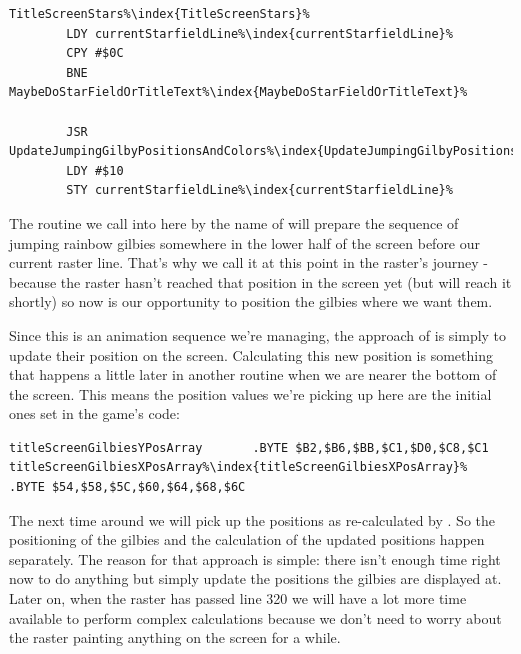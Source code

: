 \begin{lstlisting}[escapechar=\%]
TitleScreenStars%\index{TitleScreenStars}%
        LDY currentStarfieldLine%\index{currentStarfieldLine}%
        CPY #$0C
        BNE MaybeDoStarFieldOrTitleText%\index{MaybeDoStarFieldOrTitleText}%

        JSR UpdateJumpingGilbyPositionsAndColors%\index{UpdateJumpingGilbyPositionsAndColors}%
        LDY #$10
        STY currentStarfieldLine%\index{currentStarfieldLine}%
\end{lstlisting}

The routine we call into here by the name of  will prepare the sequence
of jumping rainbow gilbies somewhere in the lower half of the screen before our current raster line. That's why we
call it at this point in the raster's journey - because the raster hasn't reached that position in the screen yet
(but will reach it shortly) so now is our opportunity to position the gilbies where we want them. 

Since this is an animation sequence we're managing, the approach of  is
simply to update their position on the screen. Calculating this new position is something that happens a little later
in another routine  when we are nearer the bottom of the screen. This means the
position values we're picking up here are the initial ones set in the game's code:

\begin{lstlisting}[escapechar=\%]
titleScreenGilbiesYPosArray       .BYTE $B2,$B6,$BB,$C1,$D0,$C8,$C1
titleScreenGilbiesXPosArray%\index{titleScreenGilbiesXPosArray}%       .BYTE $54,$58,$5C,$60,$64,$68,$6C
\end{lstlisting}

The next time around we will pick up the positions as re-calculated by .
So the positioning of the gilbies and the calculation of the updated positions happen separately. The reason
for that approach is simple: there isn't enough time right now to do anything but simply update the positions the gilbies
are displayed at.
Later on, when the raster has passed line 320 we will have a lot more time available to perform complex calculations
because we don't need to worry about the raster painting anything on the screen for a while.

